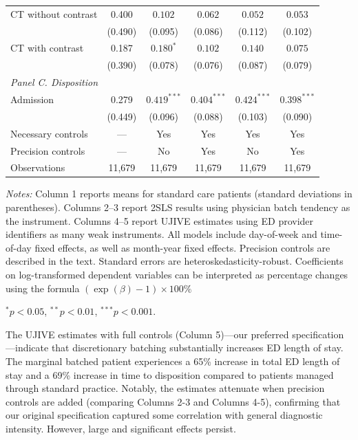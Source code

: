 \documentclass[,,blindrev]{informs}
\begin{document}
\begin{table}[t!]
\begin{threeparttable}
\begin{tabular}{lccccc}
CT without contrast 
& 0.400
& $0.102$ & $0.062$
& $0.052$ & $0.053$ \\
& (0.490)
& (0.095) & (0.086)
& (0.112) & (0.102) \\[0.5em]

CT with contrast 
& 0.187
& $0.180^{*}$ & $0.102$
& $0.140$ & $0.075$ \\
& (0.390)
& (0.078) & (0.076)
& (0.087) & (0.079) \\[0.5em]

\multicolumn{6}{l}{\textit{Panel C. Disposition}} \\[0.5em]
Admission 
& 0.279
& $0.419^{***}$ & $0.404^{***}$
& $0.424^{***}$ & $0.398^{***}$ \\
& (0.449)
& (0.096) & (0.088)
& (0.103) & (0.090) \\[0.5em]
\midrule
Necessary controls & --- & Yes & Yes & Yes & Yes \\
Precision controls & --- & No & Yes & No & Yes \\
Observations & 11,679 & 11,679 & 11,679 & 11,679 & 11,679 \\
\bottomrule
\end{tabular}
\begin{flushleft}
\footnotesize
\textit{Notes:} Column 1 reports means for standard care patients (standard deviations in parentheses). Columns 2–3 report 2SLS results using physician batch tendency as the instrument. Columns 4–5 report UJIVE estimates using ED provider identifiers as many weak instruments. All models include day-of-week and time-of-day fixed effects, as well as month-year fixed effects. Precision controls are described in the text. Standard errors are heteroskedasticity-robust. Coefficients on log-transformed dependent variables can be interpreted as percentage changes using the formula $(\exp(\beta) - 1) \times 100\%$
\item $^{*} p < 0.05$, $^{**} p < 0.01$, $^{***} p < 0.001$.
\end{flushleft}
\end{threeparttable}
\end{table}

The UJIVE estimates with full controls (Column 5)---our preferred
specification---indicate that discretionary batching substantially
increases ED length of stay. The marginal batched patient experiences a
65\% increase in total ED length of stay and a 69\% increase in time to
disposition compared to patients managed through standard practice.
Notably, the estimates attenuate when precision controls are added
(comparing Columns 2-3 and Columns 4-5), confirming that our original
specification captured some correlation with general diagnostic
intensity. However, large and significant effects persist.
\end{document}

